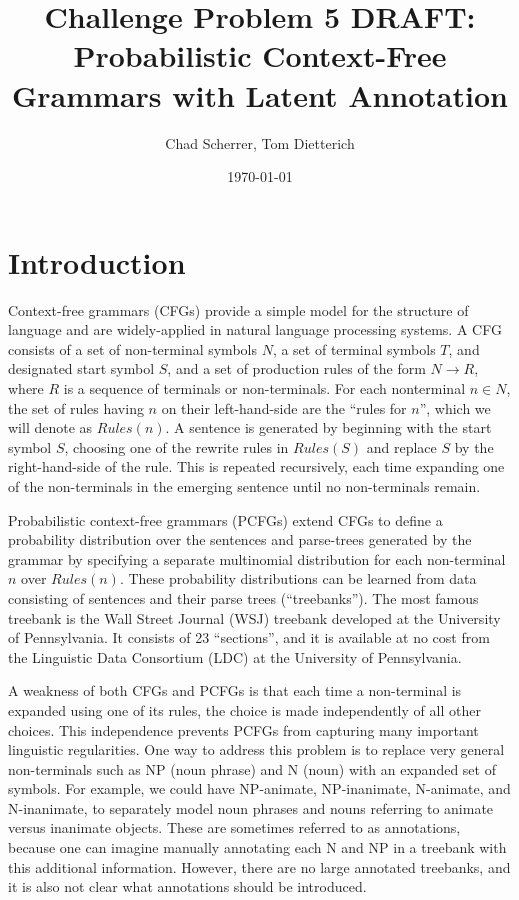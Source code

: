 \documentclass[english]{article}
\begin{document}
\title{Challenge Problem 5 DRAFT:\\
Probabilistic Context-Free Grammars with Latent Annotation}

\author{Chad Scherrer, Tom Dietterich}

\date{\today}

\maketitle

\section{Introduction}
Context-free grammars (CFGs) provide a simple model for the structure of language and are widely-applied in natural language processing systems. A CFG consists of a set of non-terminal symbols $N$, a set of terminal symbols $T$, and designated start symbol $S$, and a set of production rules of the form $N \rightarrow R$, where $R$ is a sequence of terminals or non-terminals. For each nonterminal $n \in N$, the set of rules having $n$ on their left-hand-side are the ``rules for $n$'', which we will denote as $Rules(n)$.  A sentence is generated by beginning with the start symbol $S$, choosing one of the rewrite rules in $Rules(S)$ and replace $S$ by the right-hand-side of the rule. This is repeated recursively, each time expanding one of the non-terminals in the emerging sentence until no non-terminals remain.

Probabilistic context-free grammars (PCFGs) extend CFGs to define a probability distribution over the sentences and parse-trees generated by the grammar by specifying a separate multinomial distribution for each non-terminal $n$ over $Rules(n)$.  These probability distributions can be learned from data consisting of sentences and their parse trees (``treebanks'').  The most famous treebank is the Wall Street Journal (WSJ) treebank developed at the University of Pennsylvania. It consists of 23 ``sections'', and it is available at no cost from the Linguistic Data Consortium (LDC) at the University of Pennsylvania.

A weakness of both CFGs and PCFGs is that each time a non-terminal is expanded using one of its rules, the choice is made independently of all other choices. This independence prevents PCFGs from capturing many important linguistic regularities. One way to address this problem is to replace very general non-terminals such as NP (noun phrase) and N (noun) with an expanded set of symbols.  For example, we could have NP-animate, NP-inanimate, N-animate, and N-inanimate, to separately model noun phrases and nouns referring to animate versus inanimate objects. These are sometimes referred to as annotations, because one can imagine manually annotating each N and NP in a treebank with this additional information.  However, there are no large annotated treebanks, and it is also not clear what annotations should be introduced.
\end{document}
